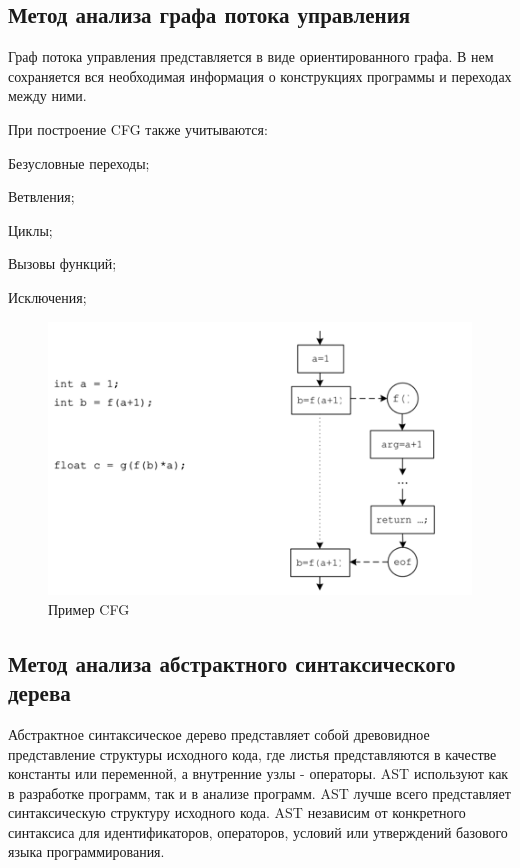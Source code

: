 \subsection{Метод анализа графа потока управления}

Граф потока управления представляется в виде ориентированного графа. В нем сохраняется вся необходимая информация о конструкциях программы и переходах между ними.

При построение CFG также учитываются:
%
\begin{itemize*}
\item Безусловные переходы;
\item Ветвления;
\item Циклы;
\item Вызовы функций;
\item Исключения;
\end{itemize*}
%

\begin{figure}[htbp]
\centering
\includegraphics[width=\textwidth]{fig/cfg_example_1.png}
\caption{Пример CFG}%
\label{fig:cfg_example_1}
\end{figure}

\subsection{Метод анализа абстрактного синтаксического дерева}

Абстрактное синтаксическое дерево представляет собой древовидное представление структуры исходного кода, где листья представляются в качестве константы или переменной, а внутренние узлы - операторы.
AST используют как в разработке программ, так и в анализе программ.
AST лучше всего представляет синтаксическую структуру исходного кода. AST независим от конкретного синтаксиса для идентификаторов, операторов, условий или утверждений базового языка программирования.

